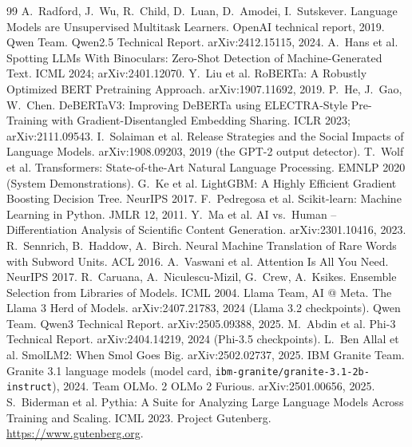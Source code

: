 \documentclass[11pt,letterpaper]{article}
\begin{document}
{\small
\begin{thebibliography}{99}\setlength{\itemsep}{1pt}
 A.~Radford, J.~Wu, R.~Child, D.~Luan, D.~Amodei, I.~Sutskever. Language Models are Unsupervised Multitask Learners. OpenAI technical report, 2019.
 Qwen Team. Qwen2.5 Technical Report. arXiv:2412.15115, 2024.
 A.~Hans et al. Spotting LLMs With Binoculars: Zero-Shot Detection of Machine-Generated Text. ICML 2024; arXiv:2401.12070.
 Y.~Liu et al. RoBERTa: A Robustly Optimized BERT Pretraining Approach. arXiv:1907.11692, 2019.
 P.~He, J.~Gao, W.~Chen. DeBERTaV3: Improving DeBERTa using ELECTRA-Style Pre-Training with Gradient-Disentangled Embedding Sharing. ICLR 2023; arXiv:2111.09543.
 I.~Solaiman et al. Release Strategies and the Social Impacts of Language Models. arXiv:1908.09203, 2019 (the GPT-2 output detector).
 T.~Wolf et al. Transformers: State-of-the-Art Natural Language Processing. EMNLP 2020 (System Demonstrations).
 G.~Ke et al. LightGBM: A Highly Efficient Gradient Boosting Decision Tree. NeurIPS 2017.
 F.~Pedregosa et al. Scikit-learn: Machine Learning in Python. JMLR 12, 2011.
 Y.~Ma et al. AI vs.\ Human -- Differentiation Analysis of Scientific Content Generation. arXiv:2301.10416, 2023.
 R.~Sennrich, B.~Haddow, A.~Birch. Neural Machine Translation of Rare Words with Subword Units. ACL 2016.
 A.~Vaswani et al. Attention Is All You Need. NeurIPS 2017.
 R.~Caruana, A.~Niculescu-Mizil, G.~Crew, A.~Ksikes. Ensemble Selection from Libraries of Models. ICML 2004.
 Llama Team, AI @ Meta. The Llama 3 Herd of Models. arXiv:2407.21783, 2024 (Llama 3.2 checkpoints).
 Qwen Team. Qwen3 Technical Report. arXiv:2505.09388, 2025.
 M.~Abdin et al. Phi-3 Technical Report. arXiv:2404.14219, 2024 (Phi-3.5 checkpoints).
 L.~Ben Allal et al. SmolLM2: When Smol Goes Big. arXiv:2502.02737, 2025.
 IBM Granite Team. Granite 3.1 language models (model card, \texttt{ibm-granite/granite-3.1-2b-instruct}), 2024.
 Team OLMo. 2 OLMo 2 Furious. arXiv:2501.00656, 2025.
 S.~Biderman et al. Pythia: A Suite for Analyzing Large Language Models Across Training and Scaling. ICML 2023.
 Project Gutenberg. \url{https://www.gutenberg.org}.
\end{thebibliography}}
\end{document}

